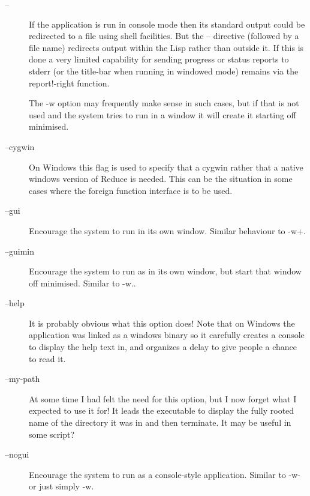 \documentclass[a4paper,11pt]{article}
\begin{document}
\begin{description}

\item [{\ttfamily --}] \index{{\ttfamily --}}
If the application is run in console mode then its standard output could
be redirected to a file using shell facilities. But the {\ttfamily --}
directive (followed by a file name) redirects output within the Lisp rather
than outside it. If this is done a very limited capability for sending
progress or status reports to stderr (or the title-bar when running in windowed
mode) remains via the {\ttfamily report!-right} function.
  
The {\ttfamily -w} option may frequently make sense in such cases, but if that
is not used and the system tries to run in a window it will create it
starting off minimised.

\item [{\ttfamily --cygwin}] 
On Windows this flag is used to specify that a cygwin rather that a native
windows version of Reduce is needed. This can be the situation in some
cases where the foreign function interface is to be used.

\item [{\ttfamily --gui}] 
Encourage the system to run in its own window. Similar behaviour
to {\ttfamily -w+}.

\item [{\ttfamily --guimin}] 
Encourage the system to run as in its own window, but
start that window off minimised. Similar
to {\ttfamily -w.}.

\item [{\ttfamily --help}] 
It is probably obvious what this option does! Note that on Windows the
application was linked as a windows binary so it carefully creates a
console to display the help text in, and organizes a delay to give
people a chance to read it.

\item [{\ttfamily --my-path}] 
At some time I had felt the need for this option, but I now forget what I
expected to use it for! It leads the executable to display the fully
rooted name of the directory it was in and then terminate. It may be useful
in some script?

\item [{\ttfamily --nogui}] 
Encourage the system to run as a console-style application. Similar
to {\ttfamily -w-} or just simply {\ttfamily -w}.


\end{description}
\end{document}
